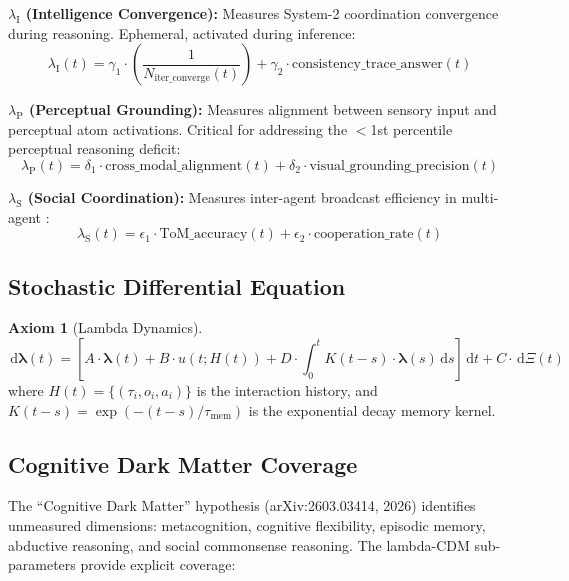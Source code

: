 \documentclass[11pt,a4paper]{article}
\theoremstyle{definition}
\newtheorem{axiom}{Axiom}[section]
\theoremstyle{remark}
\newcommand{\GWP}{\text{GWP}}
\newcommand{\lambdaI}{\lambda_{\text{I}}}
\newcommand{\lambdaP}{\lambda_{\text{P}}}
\newcommand{\lambdaS}{\lambda_{\text{S}}}
\newcommand{\lambdavec}{\boldsymbol{\lambda}}
\newcommand{\diff}{\,\mathrm{d}}
\begin{document}
\textbf{$\lambdaI$ (Intelligence Convergence):} Measures System-2 coordination convergence during reasoning. Ephemeral, activated during inference:
\begin{equation}
\lambdaI(t) = \gamma_1 \cdot \left(\frac{1}{N_{\text{iter\_converge}}(t)}\right) + \gamma_2 \cdot \text{consistency\_trace\_answer}(t)
\end{equation}

\textbf{$\lambdaP$ (Perceptual Grounding):} Measures alignment between sensory input and perceptual atom activations. Critical for addressing the $<$1st percentile perceptual reasoning deficit:
\begin{equation}
\lambdaP(t) = \delta_1 \cdot \text{cross\_modal\_alignment}(t) + \delta_2 \cdot \text{visual\_grounding\_precision}(t)
\end{equation}

\textbf{$\lambdaS$ (Social Coordination):} Measures inter-agent broadcast efficiency in multi-agent \GWP{}:
\begin{equation}
\lambdaS(t) = \epsilon_1 \cdot \text{ToM\_accuracy}(t) + \epsilon_2 \cdot \text{cooperation\_rate}(t)
\end{equation}

\subsection{Stochastic Differential Equation}\label{subsec:lambda-sde}

\begin{axiom}[Lambda Dynamics]\label{axiom:lambda-dynamics}
\begin{equation}
\diff\lambdavec(t) = \left[A \cdot \lambdavec(t) + B \cdot u(t; H(t)) + D \cdot \int_0^t K(t-s) \cdot \lambdavec(s) \diff s\right]\diff t + C \cdot \diff\Xi(t)
\end{equation}
where $H(t) = \{(\tau_i, o_i, a_i)\}$ is the interaction history, and $K(t-s) = \exp(-(t-s)/\tau_{\text{mem}})$ is the exponential decay memory kernel.
\end{axiom}

\subsection{Cognitive Dark Matter Coverage}\label{subsec:dark-matter}

The ``Cognitive Dark Matter'' hypothesis (arXiv:2603.03414, 2026) identifies unmeasured dimensions: metacognition, cognitive flexibility, episodic memory, abductive reasoning, and social commonsense reasoning. The lambda-CDM sub-parameters provide explicit coverage:
\end{document}
